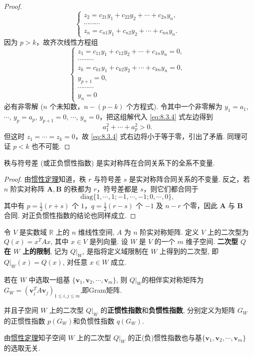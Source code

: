 \documentclass[../../main.tex]{subfiles}%
\begin{document}
\begin{proof}
\[\begin{cases}
z_2 = c_{21}y_1 + c_{22}y_2 + \cdots + c_{2n}y_n,\\
\cdots\cdots\cdots\\
z_n = c_{n1}y_1 + c_{n2}y_2 + \cdots + c_{nn}y_n.
\end{cases}
\]
因为 $p>k$，故齐次线性方程组
\[
\begin{cases}
z_1=c_{11}y_1 + c_{12}y_2 + \cdots + c_{1n}y_n = 0,\\
\cdots\cdots\cdots\\
z_k=c_{k1}y_1 + c_{k2}y_2 + \cdots + c_{kn}y_n = 0,\\
y_{p + 1} = 0,\\
\cdots\cdots\cdots\\
y_n = 0
\end{cases}
\]
必有非零解 ($n$ 个未知数，$n - (p - k)$ 个方程式). 令其中一个非零解为 $y_1 = a_1$, $\cdots$, $y_p = a_p$, $y_{p + 1} = 0$, $\cdots$, $y_n = 0$，把这组解代入 \eqref{eq:8.3.4} 式左边得到
\[
a_1^2+\cdots + a_p^2>0.
\]
但这时 $z_1 = \cdots = z_k = 0$，故 \eqref{eq:8.3.4} 式右边将小于等于零，引出了矛盾. 同理可证 $p<k$ 也不可能.
\end{proof}

\begin{theorem}\label{theorem:秩与符号差(或正负惯性指数)都是实对称阵在合同关系下的全系不变量}
秩与符号差 (或正负惯性指数) 是实对称阵在合同关系下的全系不变量.
\end{theorem}
\begin{proof}
由\hyperref[theorem:惯性定理]{惯性定理}知道，秩 $r$ 与符号差 $s$ 是实对称阵合同关系的不变量. 反之，若 $n$ 阶实对称阵 $\boldsymbol{A},\boldsymbol{B}$ 的秩都为 $r$，符号差都是 $s$，则它们都合同于
\[
\mathrm{diag}\{1,\cdots,1;-1,\cdots,-1;0,\cdots,0\},
\]
其中有 $p = \frac{1}{2}(r + s)$ 个 $1$，$q = \frac{1}{2}(r - s)$ 个 $-1$ 及 $n - r$ 个零，因此 $\boldsymbol{A}$ 与 $\boldsymbol{B}$ 合同. 对正负惯性指数的结论也同样成立. 
\end{proof}

\begin{definition}
令 $V$ 是实数域 $\mathbb{R}$ 上的 $n$ 维线性空间, $A$ 为 $n$ 阶实对称矩阵. 定义 $V$ 上的二次型为 $Q(x) = x^T A x$, 其中 $x \in V$ 是列向量.
设 $W$ 是 $V$ 的一个 $m$ 维子空间. \textbf{二次型 $Q$ 在 $W$ 上的限制}, 记为 $Q|_W$, 是指将定义域限制在 $W$ 上得到的二次型, 即 $Q|_W(x) = Q(x)$, 对任意 $x \in W$ 成立.

若在 $W$ 中选取一组基 $\{\bm{v}_1, \bm{v}_2, \cdots, \bm{v}_m\}$, 则 $Q|_W$的相伴实对称矩阵为 $G_W = (\bm{v}_i^T A \bm{v}_j)_{1 \leqslant i,j \leqslant m}$,即Gram矩阵.

并且子空间 $W$ 上的二次型 $Q|_W$ 的\textbf{正惯性指数}和\textbf{负惯性指数}, 分别定义为矩阵 $G_W$ 的正惯性指数 $p(G_W)$和负惯性指数 $q(G_W)$.
\end{definition}
\begin{remark}
由\hyperref[theorem:惯性定理]{惯性定理}知子空间 $W$ 上的二次型 $Q|_W$ 的正(负)惯性指数也与基$\{\bm{v}_1, \bm{v}_2, \cdots, \bm{v}_m\}$的选取无关.
\end{remark}
\end{document}
